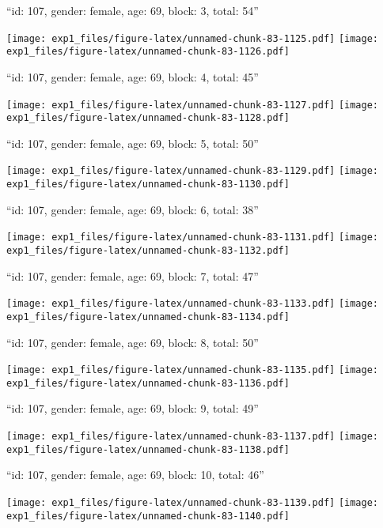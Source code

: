 \documentclass[11pt,,]{article}
\begin{document}
\newpage
[1] 

``id: 107, gender: female, age: 69, block: 3, total: 54''

\texttt{[image: exp1\_files/figure-latex/unnamed-chunk-83-1125.pdf]}
\texttt{[image: exp1\_files/figure-latex/unnamed-chunk-83-1126.pdf]}

\newpage
[1] 

``id: 107, gender: female, age: 69, block: 4, total: 45''

\texttt{[image: exp1\_files/figure-latex/unnamed-chunk-83-1127.pdf]}
\texttt{[image: exp1\_files/figure-latex/unnamed-chunk-83-1128.pdf]}

\newpage
[1] 

``id: 107, gender: female, age: 69, block: 5, total: 50''

\texttt{[image: exp1\_files/figure-latex/unnamed-chunk-83-1129.pdf]}
\texttt{[image: exp1\_files/figure-latex/unnamed-chunk-83-1130.pdf]}

\newpage
[1] 

``id: 107, gender: female, age: 69, block: 6, total: 38''

\texttt{[image: exp1\_files/figure-latex/unnamed-chunk-83-1131.pdf]}
\texttt{[image: exp1\_files/figure-latex/unnamed-chunk-83-1132.pdf]}

\newpage
[1] 

``id: 107, gender: female, age: 69, block: 7, total: 47''

\texttt{[image: exp1\_files/figure-latex/unnamed-chunk-83-1133.pdf]}
\texttt{[image: exp1\_files/figure-latex/unnamed-chunk-83-1134.pdf]}

\newpage
[1] 

``id: 107, gender: female, age: 69, block: 8, total: 50''

\texttt{[image: exp1\_files/figure-latex/unnamed-chunk-83-1135.pdf]}
\texttt{[image: exp1\_files/figure-latex/unnamed-chunk-83-1136.pdf]}

\newpage
[1] 

``id: 107, gender: female, age: 69, block: 9, total: 49''

\texttt{[image: exp1\_files/figure-latex/unnamed-chunk-83-1137.pdf]}
\texttt{[image: exp1\_files/figure-latex/unnamed-chunk-83-1138.pdf]}

\newpage
[1] 

``id: 107, gender: female, age: 69, block: 10, total: 46''

\texttt{[image: exp1\_files/figure-latex/unnamed-chunk-83-1139.pdf]}
\texttt{[image: exp1\_files/figure-latex/unnamed-chunk-83-1140.pdf]}
\end{document}
